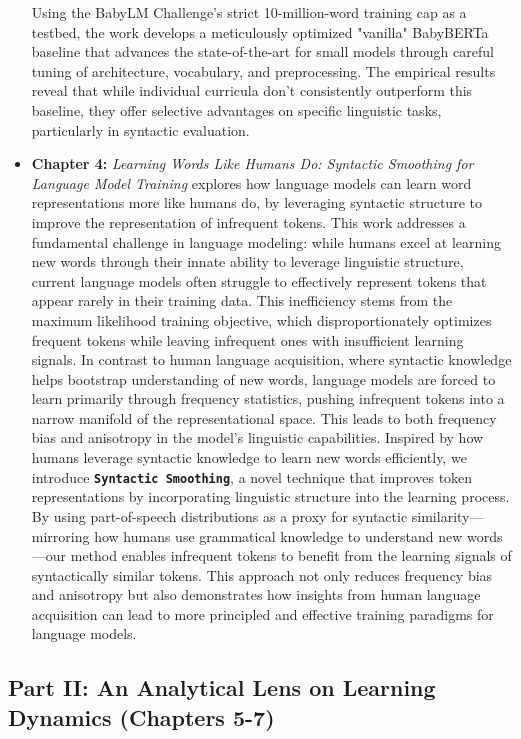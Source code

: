 \begin{itemize}
    Using the BabyLM Challenge's strict 10-million-word training cap as a testbed, the work develops a meticulously optimized "vanilla" BabyBERTa baseline that advances the state-of-the-art for small models through careful tuning of architecture, vocabulary, and preprocessing. The empirical results reveal that while individual curricula don't consistently outperform this baseline, they offer selective advantages on specific linguistic tasks, particularly in syntactic evaluation.

    \item \textbf{Chapter 4:} \emph{Learning Words Like Humans Do: Syntactic Smoothing for Language Model Training}  
    explores how language models can learn word representations more like humans do, by leveraging syntactic structure to improve the representation of infrequent tokens. This work addresses a fundamental challenge in language modeling: while humans excel at learning new words through their innate ability to leverage linguistic structure, current language models often struggle to effectively represent tokens that appear rarely in their training data. This inefficiency stems from the maximum likelihood training objective, which disproportionately optimizes frequent tokens while leaving infrequent ones with insufficient learning signals. In contrast to human language acquisition, where syntactic knowledge helps bootstrap understanding of new words, language models are forced to learn primarily through frequency statistics, pushing infrequent tokens into a narrow manifold of the representational space. This leads to both frequency bias and anisotropy in the model's linguistic capabilities. Inspired by how humans leverage syntactic knowledge to learn new words efficiently, we introduce \textbf{\texttt{Syntactic Smoothing}}, a novel technique that improves token representations by incorporating linguistic structure into the learning process. By using part-of-speech distributions as a proxy for syntactic similarity—mirroring how humans use grammatical knowledge to understand new words—our method enables infrequent tokens to benefit from the learning signals of syntactically similar tokens. This approach not only reduces frequency bias and anisotropy but also demonstrates how insights from human language acquisition can lead to more principled and effective training paradigms for language models.

\end{itemize}

\subsection*{Part II: An Analytical Lens on Learning Dynamics (Chapters 5-7)}

